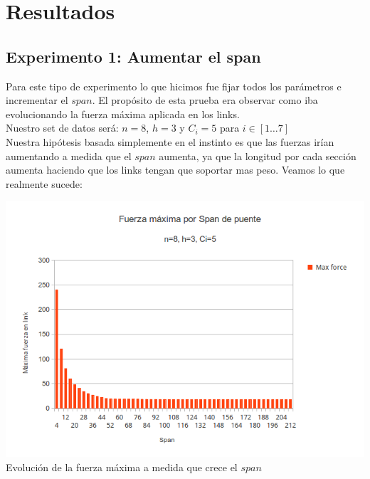 \section{Resultados}

\subsection{Experimento 1: Aumentar el span}

Para este tipo de experimento lo que hicimos fue fijar todos los parámetros e incrementar el $span$. El propósito de esta prueba era observar como iba evolucionando la fuerza máxima aplicada en los links.\\

Nuestro set de datos será: $n = 8$, $h = 3$ y $C_i = 5$ para $i \in [1 \dots 7]$\\

Nuestra hipótesis basada simplemente en el instinto es que las fuerzas irían aumentando a medida que el $span$ aumenta, ya que la longitud por cada sección aumenta haciendo que los links tengan que soportar mas peso. Veamos lo que realmente sucede:

\begin{center}
\includegraphics[scale=0.8]{archivos/graficos/Fuerza-x-span.png}\\
Evolución de la fuerza máxima a medida que crece el $span$
\end{center}

